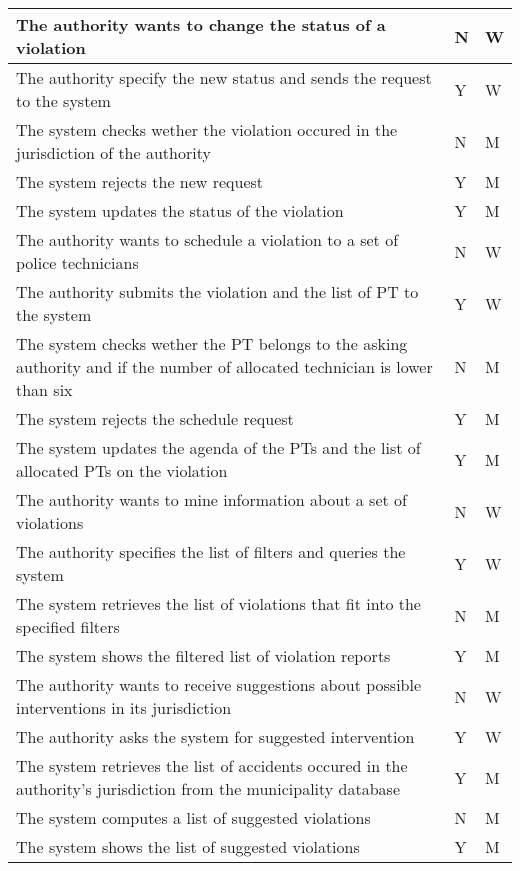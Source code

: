 \begin{longtable}{| p{} | p{} | p{} |}
      The authority wants to change the status of a violation & N & W\\
      \hline
      The authority specify the new status and sends the request to the system & Y & W\\
      \hline
      The system checks wether the violation occured in the jurisdiction of the authority & N & M\\
      \hline
      The system rejects the new request & Y & M\\
      \hline
      The system updates the status of the violation & Y & M\\
      \hline
      
      The authority wants to schedule a violation to a set of police technicians & N & W\\
      \hline
      The authority submits the violation and the list of PT to the system & Y & W\\
      \hline
      The system checks wether the PT belongs to the asking authority and if the number of allocated technician is lower than six& N & M\\
      \hline
      The system rejects the schedule request & Y & M\\
      \hline
      The system updates the agenda of the PTs and the list of allocated PTs on the violation & Y & M\\
      \hline

      The authority wants to mine information about a set of violations & N & W\\
      \hline
      The authority specifies the list of filters and queries the system & Y & W\\
      \hline
      The system retrieves the list of violations that fit into the specified filters & N & M\\
      \hline
      The system shows the filtered list of violation reports & Y & M\\
      \hline

      The authority wants to receive suggestions about possible interventions in its jurisdiction & N & W\\
      \hline
      The authority asks the system for suggested intervention & Y & W\\
      \hline
      The system retrieves the list of accidents occured in the authority's jurisdiction from the municipality database & Y & M\\
      \hline
      The system computes a list of suggested violations & N & M\\
      \hline
      The system shows the list of suggested violations & Y & M\\
      \hline
  \end{longtable}